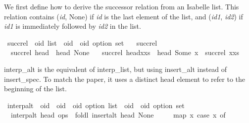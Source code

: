 \begin{isabellebody}
\begin{isamarkuptext}
We first define how to derive the successor relation from an Isabelle list.
This relation contains (\emph{id}, None) if \emph{id} is the last element
of the list, and (\emph{id1}, \emph{id2}) if \emph{id1} is immediately
followed by \emph{id2} in the list.%
\end{isamarkuptext}\isamarkuptrue%
\isamarkupfalse%
\ succ{\isacharunderscore}rel\ {\isacharcolon}{\isacharcolon}\ {\isachardoublequoteopen}{\isacharprime}oid\ list\ {\isasymRightarrow}\ {\isacharparenleft}{\isacharprime}oid\ {\isasymtimes}\ {\isacharprime}oid\ option{\isacharparenright}\ set{\isachardoublequoteclose}\ \isanewline
\ \ {\isachardoublequoteopen}succ{\isacharunderscore}rel\ {\isacharbrackleft}{\isacharbrackright}\ {\isacharequal}\ {\isacharbraceleft}{\isacharbraceright}{\isachardoublequoteclose}\ {\isacharbar}\isanewline
\ \ {\isachardoublequoteopen}succ{\isacharunderscore}rel\ {\isacharbrackleft}head{\isacharbrackright}\ {\isacharequal}\ {\isacharbraceleft}{\isacharparenleft}head{\isacharcomma}\ None{\isacharparenright}{\isacharbraceright}{\isachardoublequoteclose}\ {\isacharbar}\isanewline
\ \ {\isachardoublequoteopen}succ{\isacharunderscore}rel\ {\isacharparenleft}head{\isacharhash}x{\isacharhash}xs{\isacharparenright}\ {\isacharequal}\ {\isacharbraceleft}{\isacharparenleft}head{\isacharcomma}\ Some\ x{\isacharparenright}{\isacharbraceright}\ {\isasymunion}\ succ{\isacharunderscore}rel\ {\isacharparenleft}x{\isacharhash}xs{\isacharparenright}{\isachardoublequoteclose}%
\begin{isamarkuptext}%
interp\_alt is the equivalent of interp\_list, but using insert\_alt
instead of insert\_spec. To match the paper, it uses a distinct head element
to refer to the beginning of the list.%
\end{isamarkuptext}\isamarkuptrue%
\isamarkupfalse%
\ interp{\isacharunderscore}alt\ {\isacharcolon}{\isacharcolon}\ {\isachardoublequoteopen}{\isacharprime}oid\ {\isasymRightarrow}\ {\isacharparenleft}{\isacharprime}oid\ {\isasymtimes}\ {\isacharprime}oid\ option{\isacharparenright}\ list\ {\isasymRightarrow}\ {\isacharparenleft}{\isacharprime}oid\ {\isasymtimes}\ {\isacharprime}oid\ option{\isacharparenright}\ set{\isachardoublequoteclose}\ \isanewline
\ \ {\isachardoublequoteopen}interp{\isacharunderscore}alt\ head\ ops\ {\isasymequiv}\ foldl\ insert{\isacharunderscore}alt\ {\isacharbraceleft}{\isacharparenleft}head{\isacharcomma}\ None{\isacharparenright}{\isacharbraceright}\isanewline
\ \ \ \ \ {\isacharparenleft}map\ {\isacharparenleft}{\isasymlambda}x{\isachardot}\ case\ x\ of\isanewline

\end{isabellebody}
